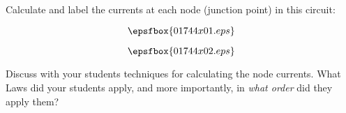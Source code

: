 

Calculate and label the currents at each node (junction point) in this circuit:

$$\epsfbox{01744x01.eps}$$







$$\epsfbox{01744x02.eps}$$







Discuss with your students techniques for calculating the node currents.  What Laws did your students apply, and more importantly, in {\it what order} did they apply them?




